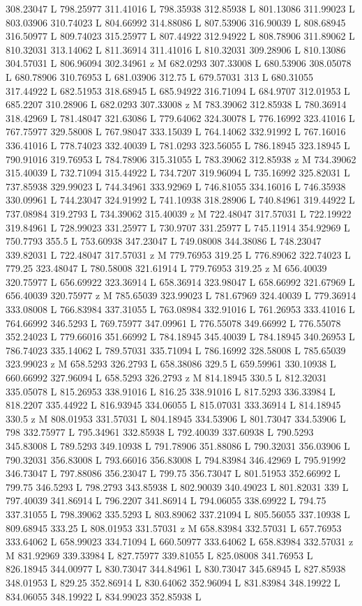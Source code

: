 {\begin{scope}[local bounding box=bb]
{308.23047 L 798.25977 311.41016 L 798.35938 312.85938 L 801.13086 311.99023 L 803.03906 310.74023 L 804.66992 314.88086 L 807.53906 316.90039 L 808.68945 316.50977 L 809.74023 315.25977 L 807.44922 312.94922 L 808.78906 311.89062 L 810.32031 313.14062 L 811.36914 311.41016 L 810.32031 309.28906 L 810.13086 304.57031 L 806.96094 302.34961 z M 682.0293 307.33008 L 680.53906 308.05078 L 680.78906 310.76953 L 681.03906 312.75 L 679.57031 313 L 680.31055 317.44922 L 682.51953 318.68945 L 685.94922 316.71094 L 684.9707 312.01953 L 685.2207 310.28906 L 682.0293 307.33008 z M 783.39062 312.85938 L 780.36914 318.42969 L 781.48047 321.63086 L 779.64062 324.30078 L 776.16992 323.41016 L 767.75977 329.58008 L 767.98047 333.15039 L 764.14062 332.91992 L 767.16016 336.41016 L 778.74023 332.40039 L 781.0293 323.56055 L 786.18945 323.18945 L 790.91016 319.76953 L 784.78906 315.31055 L 783.39062 312.85938 z M 734.39062 315.40039 L 732.71094 315.44922 L 734.7207 319.96094 L 735.16992 325.82031 L 737.85938 329.99023 L 744.34961 333.92969 L 746.81055 334.16016 L 746.35938 330.09961 L 744.23047 324.91992 L 741.10938 318.28906 L 740.84961 319.44922 L 737.08984 319.2793 L 734.39062 315.40039 z M 722.48047 317.57031 L 722.19922 319.84961 L 728.99023 331.25977 L 730.9707 331.25977 L 745.11914 354.92969 L 750.7793 355.5 L 753.60938 347.23047 L 749.08008 344.38086 L 748.23047 339.82031 L 722.48047 317.57031 z M 779.76953 319.25 L 776.89062 322.74023 L 779.25 323.48047 L 780.58008 321.61914 L 779.76953 319.25 z M 656.40039 320.75977 L 656.69922 323.36914 L 658.36914 323.98047 L 658.66992 321.67969 L 656.40039 320.75977 z M 785.65039 323.99023 L 781.67969 324.40039 L 779.36914 333.08008 L 766.83984 337.31055 L 763.08984 332.91016 L 761.26953 333.41016 L 764.66992 346.5293 L 769.75977 347.09961 L 776.55078 349.66992 L 776.55078 352.24023 L 779.66016 351.66992 L 784.18945 345.40039 L 784.18945 340.26953 L 786.74023 335.14062 L 789.57031 335.71094 L 786.16992 328.58008 L 785.65039 323.99023 z M 658.5293 326.2793 L 658.38086 329.5 L 659.59961 330.10938 L 660.66992 327.96094 L 658.5293 326.2793 z M 814.18945 330.5 L 812.32031 335.05078 L 815.26953 338.91016 L 816.25 338.91016 L 817.5293 336.33984 L 818.2207 335.44922 L 816.93945 334.06055 L 815.07031 333.36914 L 814.18945 330.5 z M 808.01953 331.57031 L 804.18945 334.53906 L 801.73047 334.53906 L 798 332.75977 L 795.34961 332.85938 L 792.40039 337.60938 L 790.5293 345.83008 L 789.5293 349.10938 L 791.78906 351.88086 L 790.32031 356.03906 L 790.32031 356.83008 L 793.66016 356.83008 L 794.83984 346.42969 L 795.91992 346.73047 L 797.88086 356.23047 L 799.75 356.73047 L 801.51953 352.66992 L 799.75 346.5293 L 798.2793 343.85938 L 802.90039 340.49023 L 801.82031 339 L 797.40039 341.86914 L 796.2207 341.86914 L 794.06055 338.69922 L 794.75 337.31055 L 798.39062 335.5293 L 803.89062 337.21094 L 805.56055 337.10938 L 809.68945 333.25 L 808.01953 331.57031 z M 658.83984 332.57031 L 657.76953 333.64062 L 658.99023 334.71094 L 660.50977 333.64062 L 658.83984 332.57031 z M 831.92969 339.33984 L 827.75977 339.81055 L 825.08008 341.76953 L 826.18945 344.00977 L 830.73047 344.84961 L 830.73047 345.68945 L 827.85938 348.01953 L 829.25 352.86914 L 830.64062 352.96094 L 831.83984 348.19922 L 834.06055 348.19922 L 834.99023 352.85938 L }
\end{scope}}
